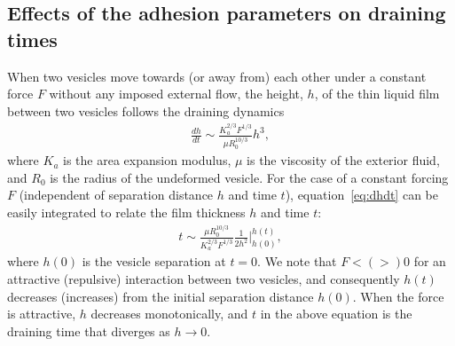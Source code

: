 \documentclass[prf,superscriptaddress,showkeys]{revtex4-1}
\begin{document}
\subsection{Effects of the adhesion parameters on draining times}
\label{subsec:qflow_draining_times}
When two vesicles move towards (or away from) each other under a
constant force $F$ without any imposed external flow, the height, $h$,
of the thin liquid film between two vesicles follows the draining
dynamics~\cite{RamachandranLeal2010_PoF}
\begin{align}
  \label{eq:dhdt}
  \frac{d h}{dt} \sim \frac{K_a^{2/3} F^{1/3}}{\mu R_0^{10/3}} h^3,
\end{align}
where $K_a$ is the area expansion modulus, $\mu$ is the viscosity of the
exterior fluid, and $R_0$ is the radius of the undeformed vesicle.  For
the case of a constant forcing $F$ (independent of separation distance
$h$ and time $t$), equation~\eqref{eq:dhdt} can be easily integrated to
relate the film thickness $h$ and time $t$:
\begin{align*}
  t \sim \frac{\mu R_0^{10/3}}{K_a^{2/3} F^{1/3}}
    \frac{1}{2 h^2} \bigg|^{h(t)}_{h(0)},
\end{align*}
where $h(0)$ is the vesicle separation at $t=0$.  We note that $F< (>)
0$ for an attractive  (repulsive) interaction between two vesicles,  and
consequently $h(t)$ decreases (increases) from  the initial separation
distance $h(0)$.  When the force is attractive, $h$ decreases
monotonically, and $t$ in the above equation is the draining time that
diverges as $h\rightarrow 0$.
\end{document}
